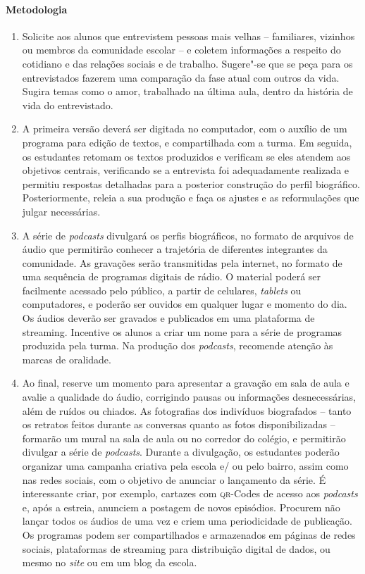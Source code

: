 \documentclass[11pt]{extarticle}
\begin{document}
 \paragraph{Metodologia}
   \begin{enumerate}
    \item
    Solicite aos alunos que
entrevistem pessoas mais velhas -- familiares, vizinhos ou membros da
comunidade escolar -- e coletem informações a respeito do cotidiano e
das relações sociais e de trabalho. Sugere"-se que se peça para os
entrevistados fazerem uma comparação da fase atual com outros da vida. Sugira 
temas como o amor, trabalhado na última aula, dentro da história
de vida do entrevistado.

  \item
  A primeira versão deverá ser digitada no computador, com o auxílio de um
programa para edição de textos, e compartilhada com a turma. Em seguida,
os estudantes retomam os textos produzidos e verificam se eles atendem
aos objetivos centrais, verificando se a entrevista foi adequadamente
realizada e permitiu respostas detalhadas para a posterior construção do
perfil biográfico. Posteriormente, releia a sua produção e faça os
ajustes e as reformulações que julgar necessárias.

  \item
A série de \emph{podcasts} divulgará os perfis biográficos, no formato
de arquivos de áudio que permitirão conhecer a trajetória de diferentes
integrantes da comunidade. As gravações serão transmitidas pela
internet, no formato de uma sequência de programas digitais de rádio. O
material poderá ser facilmente acessado pelo público, a partir de
celulares, \emph{tablets} ou computadores, e poderão ser ouvidos em
qualquer lugar e momento do dia. Os áudios deverão ser gravados e
publicados em uma plataforma de streaming. Incentive os alunos a criar
um nome para a série de programas produzida pela turma. Na produção dos
\emph{podcasts}, recomende atenção às marcas de oralidade.


  \item
  Ao final, reserve um momento para apresentar a gravação em sala de aula
e avalie a qualidade do áudio, corrigindo pausas ou informações
desnecessárias, além de ruídos ou chiados. As fotografias dos indivíduos
biografados -- tanto os retratos feitos durante as conversas quanto as
fotos disponibilizadas -- formarão um mural na sala de aula ou no
corredor do colégio, e permitirão divulgar a série de \emph{podcasts}.
Durante a divulgação, os estudantes poderão organizar uma campanha
criativa pela escola e/ ou pelo bairro, assim como nas redes sociais,
com o objetivo de anunciar o lançamento da série. É interessante criar,
por exemplo, cartazes com \textsc{qr}-Codes de acesso aos \emph{podcasts} e, após
a estreia, anunciem a postagem de novos episódios. Procurem não lançar
todos os áudios de uma vez e criem uma periodicidade de publicação. Os
programas podem ser compartilhados e armazenados em páginas de redes
sociais, plataformas de streaming para distribuição digital de dados, ou
mesmo no \emph{site} ou em um blog da escola.

   \end{enumerate}
\end{document}
